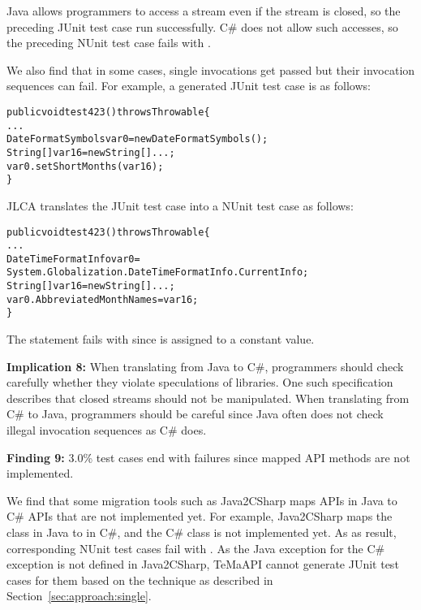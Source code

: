Java allows programmers to access a stream even if the stream is closed, so the preceding JUnit test case run successfully. C\# does not allow such accesses, so the preceding NUnit test case fails with .

We also find that in some cases, single invocations get passed but their invocation sequences can fail. For example, a generated JUnit test case is as follows:

\begin{CodeOut}%
\begin{alltt}
public void test423() throws Throwable\{
  ...
  DateFormatSymbols var0=new DateFormatSymbols();
  String[] var16=new String[]{...};
  var0.setShortMonths(var16);
\}
\end{alltt}
\end{CodeOut}

JLCA translates the JUnit test case into a NUnit test case as follows:

\begin{CodeOut}%
\begin{alltt}
public void test423() throws Throwable\{
  ...
  DateTimeFormatInfo var0 =
  System.Globalization.DateTimeFormatInfo.CurrentInfo;
  String[] var16=new String[]{...};
  var0.AbbreviatedMonthNames = var16;
\}
\end{alltt}
\end{CodeOut}

The  statement fails with  since  is assigned to a constant value.

\textbf{Implication 8:} When translating from Java to C\#, programmers should check carefully whether they violate speculations of libraries. One such specification describes that closed streams should not be manipulated. When translating from C\# to Java, programmers should be careful since Java often does not check illegal invocation sequences as C\# does.


\textbf{Finding 9:} 3.0\% test cases end with failures since mapped API methods are not implemented.

We find that some migration tools such as Java2CSharp maps APIs in Java to C\# APIs that are not implemented yet. For example, Java2CSharp maps the  class in Java to  in C\#, and the C\# class is not implemented yet. As as result, corresponding NUnit test cases fail with . As the Java exception for the C\# exception is not defined in Java2CSharp, TeMaAPI cannot generate JUnit test cases for them based on the technique as described in Section~\ref{sec:approach:single}.

